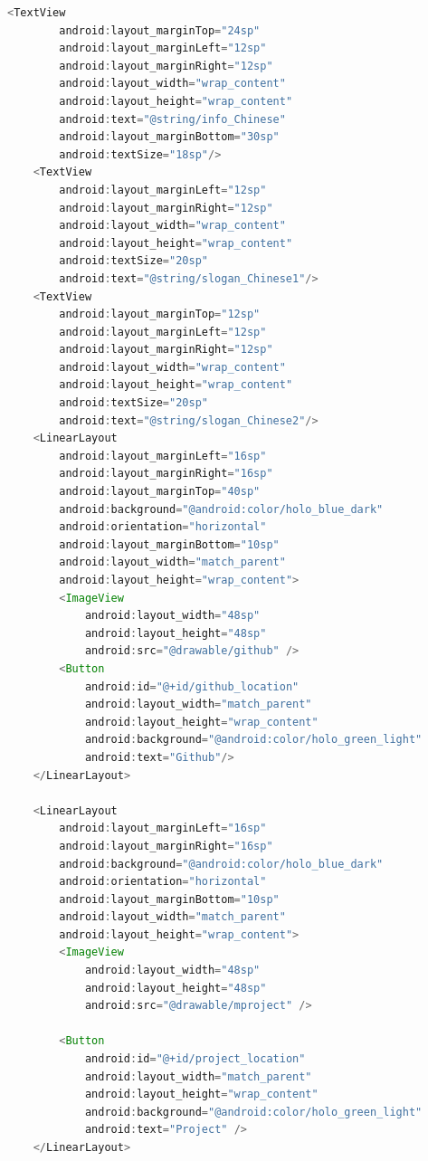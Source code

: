\documentclass[UTF8, Microsoft YaHei]{book}
\begin{document}
\begin{small}
\begin{lstlisting}[language=java]
    <TextView
        android:layout_marginTop="24sp"
        android:layout_marginLeft="12sp"
        android:layout_marginRight="12sp"
        android:layout_width="wrap_content"
        android:layout_height="wrap_content"
        android:text="@string/info_Chinese"
        android:layout_marginBottom="30sp"
        android:textSize="18sp"/>
    <TextView
        android:layout_marginLeft="12sp"
        android:layout_marginRight="12sp"
        android:layout_width="wrap_content"
        android:layout_height="wrap_content"
        android:textSize="20sp"
        android:text="@string/slogan_Chinese1"/>
    <TextView
        android:layout_marginTop="12sp"
        android:layout_marginLeft="12sp"
        android:layout_marginRight="12sp"
        android:layout_width="wrap_content"
        android:layout_height="wrap_content"
        android:textSize="20sp"
        android:text="@string/slogan_Chinese2"/>
    <LinearLayout
        android:layout_marginLeft="16sp"
        android:layout_marginRight="16sp"
        android:layout_marginTop="40sp"
        android:background="@android:color/holo_blue_dark"
        android:orientation="horizontal"
        android:layout_marginBottom="10sp"
        android:layout_width="match_parent"
        android:layout_height="wrap_content">
        <ImageView
            android:layout_width="48sp"
            android:layout_height="48sp"
            android:src="@drawable/github" />
        <Button
            android:id="@+id/github_location"
            android:layout_width="match_parent"
            android:layout_height="wrap_content"
            android:background="@android:color/holo_green_light"
            android:text="Github"/>
    </LinearLayout>

    <LinearLayout
        android:layout_marginLeft="16sp"
        android:layout_marginRight="16sp"
        android:background="@android:color/holo_blue_dark"
        android:orientation="horizontal"
        android:layout_marginBottom="10sp"
        android:layout_width="match_parent"
        android:layout_height="wrap_content">
        <ImageView
            android:layout_width="48sp"
            android:layout_height="48sp"
            android:src="@drawable/mproject" />

        <Button
            android:id="@+id/project_location"
            android:layout_width="match_parent"
            android:layout_height="wrap_content"
            android:background="@android:color/holo_green_light"
            android:text="Project" />
    </LinearLayout>


\end{lstlisting}
\end{small}
\end{document}
